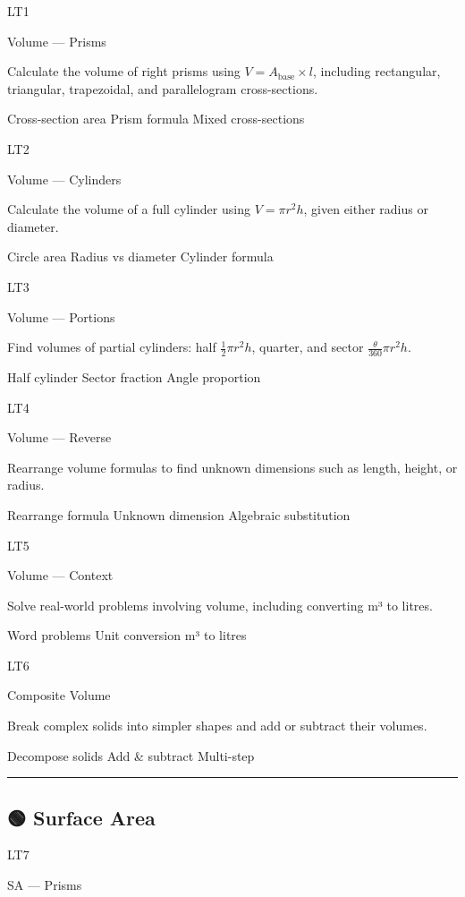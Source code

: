 \documentclass[
  letterpaper,
  DIV=11,
  numbers=noendperiod]{scrreprt}
\theoremstyle{definition}
\theoremstyle{remark}
\begin{document}
LT1

Volume --- Prisms

Calculate the volume of right prisms using
\(V = A_{\text{base}} \times l\), including rectangular, triangular,
trapezoidal, and parallelogram cross-sections.

{Cross-section area} {Prism formula} {Mixed cross-sections}

LT2

Volume --- Cylinders

Calculate the volume of a full cylinder using \(V = \pi r^2 h\), given
either radius or diameter.

{Circle area} {Radius vs diameter} {Cylinder formula}

LT3

Volume --- Portions

Find volumes of partial cylinders: half \(\tfrac{1}{2}\pi r^2 h\),
quarter, and sector \(\tfrac{\theta}{360}\pi r^2 h\).

{Half cylinder} {Sector fraction} {Angle proportion}

LT4

Volume --- Reverse

Rearrange volume formulas to find unknown dimensions such as length,
height, or radius.

{Rearrange formula} {Unknown dimension} {Algebraic substitution}

LT5

Volume --- Context

Solve real-world problems involving volume, including converting m³ to
litres.

{Word problems} {Unit conversion} {m³ to litres}

LT6

Composite Volume

Break complex solids into simpler shapes and add or subtract their
volumes.

{Decompose solids} {Add \& subtract} {Multi-step}

\begin{center}\rule{0.5\linewidth}{0.5pt}\end{center}

\subsection*{🟢 Surface Area}\label{surface-area}

LT7

SA --- Prisms
\end{document}
